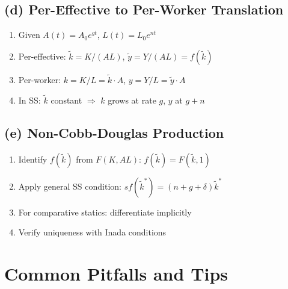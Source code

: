 \documentclass[a4paper,11pt]{article}
\newcommand{\ktilde}{\tilde{k}}
\newcommand{\ytilde}{\tilde{y}}
\begin{document}
\subsection*{(d) Per-Effective to Per-Worker Translation}

\begin{enumerate}
    \item Given $A(t) = A_0 e^{gt}$, $L(t) = L_0 e^{nt}$
    \item Per-effective: $\ktilde = K/(AL)$, $\ytilde = Y/(AL) = f(\ktilde)$
    \item Per-worker: $k = K/L = \ktilde \cdot A$, $y = Y/L = \ytilde \cdot A$
    \item In SS: $\ktilde$ constant $\Rightarrow$ $k$ grows at rate $g$, $y$ at $g+n$
\end{enumerate}

\subsection*{(e) Non-Cobb-Douglas Production}

\begin{enumerate}
    \item Identify $f(\ktilde)$ from $F(K, AL)$: $f(\ktilde) = F(\ktilde, 1)$
    \item Apply general SS condition: $s f(\ktilde^{*}) = (n + g + \delta)\ktilde^{*}$
    \item For comparative statics: differentiate implicitly
    \item Verify uniqueness with Inada conditions
\end{enumerate}

\clearpage

\section{Common Pitfalls and Tips}
\end{document}
